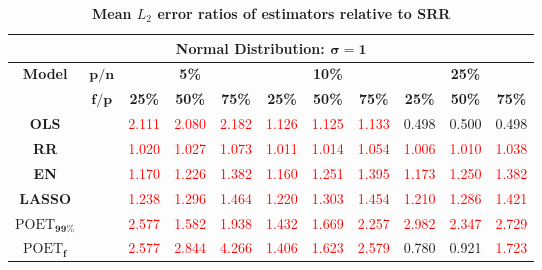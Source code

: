 \begin{table}[ht!]
\setlength{\tabcolsep}{0pt}
\renewcommand{\arraystretch}{1}
\Large
\caption{\textbf{Mean $L_2$ error ratios of estimators relative to SRR}}
\label{mean_l2_error_ratios_SRR}
\footnotesize{
\begin{tabular*}{\textwidth}{@{\extracolsep{\fill}}ccccccccccc@{}}
\toprule
\multicolumn{11}{c}{\textbf{Normal Distribution: $\bm\sigma=\textbf{1}$}}\\
\midrule
\multirow{2}{*}{\textbf{Model}} & $\bm{p/n}$ & \multicolumn{3}{c}{\textbf{5\%}} & \multicolumn{3}{c}{\textbf{10\%}} & \multicolumn{3}{c}{\textbf{25\%}} \\
\cmidrule{3-5}
\cmidrule{6-8}
\cmidrule{9-11}
\multirow{2}{*}{} & $\bm{f/p}$ & \textbf{25\%} & \textbf{50\%} & \textbf{75\%} & \textbf{25\%} & \textbf{50\%} & \textbf{75\%} & \textbf{25\%} & \textbf{50\%} & \textbf{75\%} \\
\midrule
\textbf{OLS} &  & \textcolor{red}{2.111} & \textcolor{red}{2.080} & \textcolor{red}{2.182} & \textcolor{red}{1.126} & \textcolor{red}{1.125} & \textcolor{red}{1.133} & 0.498 & 0.500 & 0.498 \\
\textbf{RR} &  & \textcolor{red}{1.020} & \textcolor{red}{1.027} & \textcolor{red}{1.073} & \textcolor{red}{1.011} & \textcolor{red}{1.014} & \textcolor{red}{1.054} & \textcolor{red}{1.006} & \textcolor{red}{1.010} & \textcolor{red}{1.038} \\
\textbf{EN} &  & \textcolor{red}{1.170} & \textcolor{red}{1.226} & \textcolor{red}{1.382} & \textcolor{red}{1.160} & \textcolor{red}{1.251} & \textcolor{red}{1.395} & \textcolor{red}{1.173} & \textcolor{red}{1.250} & \textcolor{red}{1.382} \\
\textbf{LASSO} &  & \textcolor{red}{1.238} & \textcolor{red}{1.296} & \textcolor{red}{1.464} & \textcolor{red}{1.220} & \textcolor{red}{1.303} & \textcolor{red}{1.454} & \textcolor{red}{1.210} & \textcolor{red}{1.286} & \textcolor{red}{1.421} \\
\textbf{$\text{POET}_{\bm{99\%}}$} &  & \textcolor{red}{2.577} & \textcolor{red}{1.582} & \textcolor{red}{1.938} & \textcolor{red}{1.432} & \textcolor{red}{1.669} & \textcolor{red}{2.257} & \textcolor{red}{2.982} & \textcolor{red}{2.347} & \textcolor{red}{2.729} \\
\textbf{$\text{POET}_{\bm{f}}$} &  & \textcolor{red}{2.577} & \textcolor{red}{2.844} & \textcolor{red}{4.266} & \textcolor{red}{1.406} & \textcolor{red}{1.623} & \textcolor{red}{2.579} & 0.780 & 0.921 & \textcolor{red}{1.723} \\

\end{tabular*}}
\end{table}
